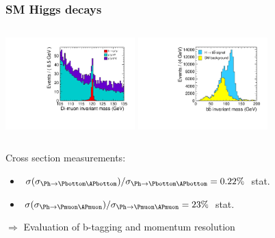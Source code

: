\documentclass{beamer}
\begin{document}
\begin{frame}
\frametitle{SM Higgs decays}
\begin{columns}[c]
\column{6cm}
\centering
\includegraphics[width=5cm]{ee_h_mumu_mass_mh120GeV}
\column{6cm}
\centering
\includegraphics[width=5cm]{ee_h_bb_mass_mh120GeV}
\end{columns}
Cross section measurements:
\begin{itemize}
  \item
  $\sigma(\sigma_{\Ph\to\Pbottom\APbottom})/\sigma_{\Ph\to\Pbottom\APbottom} =
  0.22\%$ stat.
  \item $\sigma(\sigma_{\Ph\to\Pmuon\APmuon})/\sigma_{\Ph\to\Pmuon\APmuon}
  = 23\%$ stat.
\end{itemize}
$\Rightarrow$ Evaluation of b-tagging and momentum resolution
\end{frame}
\end{document}

